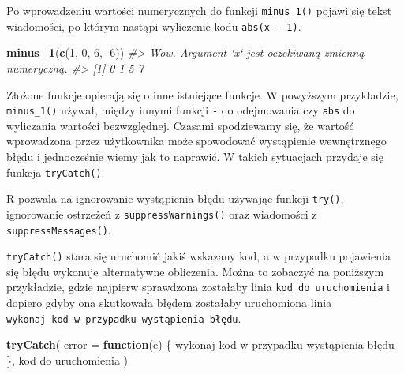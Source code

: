 \documentclass[paper=6in:9in,pagesize=pdftex,headinclude=on,footinclude=on,10pt]{scrbook}
\makeatletter
\newenvironment{Shaded}{\begin{snugshade}}{\end{snugshade}}
\newcommand{\CommentTok}[1]{\textcolor[rgb]{0.56,0.35,0.01}{\textit{#1}}}
\newcommand{\ControlFlowTok}[1]{\textcolor[rgb]{0.13,0.29,0.53}{\textbf{#1}}}
\newcommand{\DataTypeTok}[1]{\textcolor[rgb]{0.13,0.29,0.53}{#1}}
\newcommand{\DecValTok}[1]{\textcolor[rgb]{0.00,0.00,0.81}{#1}}
\newcommand{\KeywordTok}[1]{\textcolor[rgb]{0.13,0.29,0.53}{\textbf{#1}}}
\newcommand{\NormalTok}[1]{#1}
\newenvironment{kframe}{%
\medskip{}
\setlength{\fboxsep}{.8em}
 \def\at@end@of@kframe{}%
 \ifinner\ifhmode%
  \def\at@end@of@kframe{\end{minipage}}%
  \begin{minipage}{\columnwidth}%
 \fi\fi%
 \def\FrameCommand##1{\hskip\@totalleftmargin \hskip-\fboxsep
 \colorbox{shadecolor}{##1}\hskip-\fboxsep
     \hskip-\linewidth \hskip-\@totalleftmargin \hskip\columnwidth}%
 \MakeFramed {\advance\hsize-\width
   \@totalleftmargin\z@ \linewidth\hsize
   \@setminipage}}%
 {\par\unskip\endMakeFramed%
 \at@end@of@kframe}
\newenvironment{rmdblock}[1]
  {
  \begin{itemize}
  \renewcommand{\labelitemi}{
    \raisebox{-.7\height}[0pt][0pt]{
      {\setkeys{Gin}{width=3em,keepaspectratio}\texttt{[image: images/\#1]}}
    }
  }
  \setlength{\fboxsep}{1em}
  \begin{kframe}
  \item
  }
  {
  \end{kframe}
  \end{itemize}
  }
\newenvironment{rmdinfo}
  {\begin{rmdblock}{compass}}
  {\end{rmdblock}}
\makeatother
\begin{document}
Po wprowadzeniu wartości numerycznych do funkcji \texttt{minus\_1()} pojawi się tekst wiadomości, po którym nastąpi wyliczenie kodu \texttt{abs(x\ -\ 1)}.

\begin{Shaded}
\begin{Highlighting}[]
\KeywordTok{minus_1}\NormalTok{(}\KeywordTok{c}\NormalTok{(}\DecValTok{1}\NormalTok{, }\DecValTok{0}\NormalTok{, }\DecValTok{6}\NormalTok{, }\DecValTok{-6}\NormalTok{))}
\CommentTok{#> Wow. Argument `x` jest oczekiwaną zmienną numeryczną.}
\CommentTok{#> [1] 0 1 5 7}
\end{Highlighting}
\end{Shaded}

Złożone funkcje opierają się o inne istniejące funkcje.
W powyższym przykładzie, \texttt{minus\_1()} używał, między innymi funkcji \texttt{-} do odejmowania czy \texttt{abs} do wyliczania wartości bezwzględnej.
Czasami spodziewamy się, że wartość wprowadzona przez użytkownika może spowodować wystąpienie wewnętrznego błędu i jednocześnie wiemy jak to naprawić.
W takich sytuacjach przydaje się funkcja \texttt{tryCatch()}.

\begin{rmdinfo}
\begin{rmdinfo}

R pozwala na ignorowanie wystąpienia błędu używając funkcji \texttt{try()}, ignorowanie ostrzeżeń z \texttt{suppressWarnings()} oraz wiadomości z \texttt{suppressMessages()}.

\end{rmdinfo}
\end{rmdinfo}

\texttt{tryCatch()} stara się uruchomić jakiś wskazany kod, a w przypadku pojawienia się błędu wykonuje alternatywne obliczenia.
Można to zobaczyć na poniższym przykładzie, gdzie najpierw sprawdzona zostałaby linia \texttt{kod\ do\ uruchomienia} i dopiero gdyby ona skutkowała błędem zostałaby uruchomiona linia \texttt{wykonaj\ kod\ w\ przypadku\ wystąpienia\ błędu}.

\begin{Shaded}
\begin{Highlighting}[]
\KeywordTok{tryCatch}\NormalTok{(}
  \DataTypeTok{error =} \ControlFlowTok{function}\NormalTok{(e) \{}
\NormalTok{    wykonaj kod w przypadku wystąpienia błędu}
\NormalTok{  \},}
\NormalTok{  kod do uruchomienia }
\NormalTok{)}
\end{Highlighting}
\end{Shaded}
\end{document}
